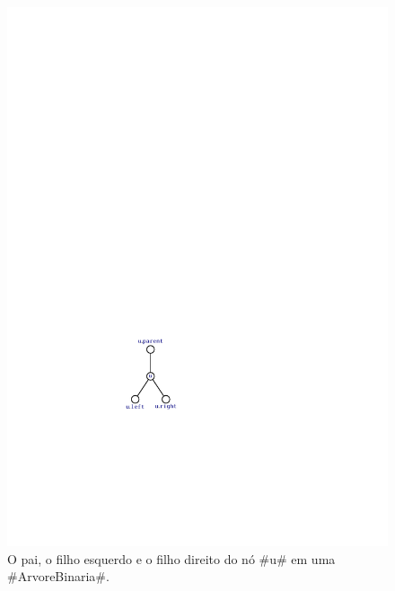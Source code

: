 \begin{figure}
  \begin{center}
    \includegraphics[scale=0.90909]{figs/bintree-traverse-1} 
  \end{center}
  \caption[Pai e filhos esquerdo e direito]{O pai, o filho esquerdo e o filho direito do nó  #u#
    em uma #ArvoreBinaria#.}
\end{figure}


